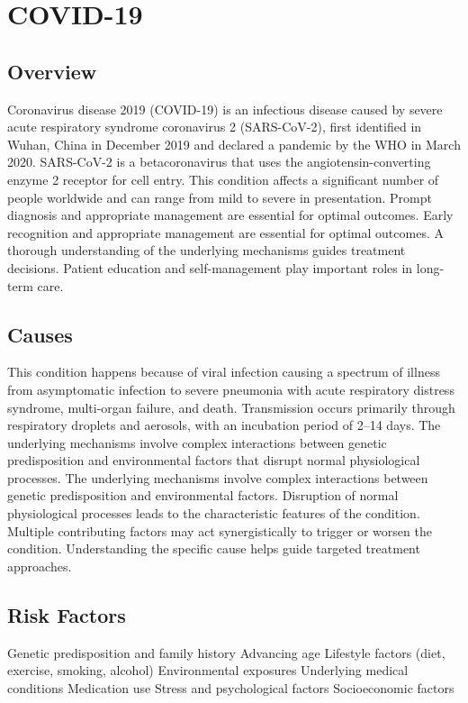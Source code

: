 \chapter{COVID-19}
\label{sec:COVID-19}

\section{Overview}
Coronavirus disease 2019 (COVID-19) is an infectious disease caused by severe acute respiratory syndrome coronavirus 2 (SARS-CoV-2), first identified in Wuhan, China in December 2019 and declared a pandemic by the WHO in March 2020. SARS-CoV-2 is a betacoronavirus that uses the angiotensin-converting enzyme 2 receptor for cell entry. This condition affects a significant number of people worldwide and can range from mild to severe in presentation. Prompt diagnosis and appropriate management are essential for optimal outcomes. Early recognition and appropriate management are essential for optimal outcomes. A thorough understanding of the underlying mechanisms guides treatment decisions. Patient education and self-management play important roles in long-term care.
\section{Causes}
This condition happens because of viral infection causing a spectrum of illness from asymptomatic infection to severe pneumonia with acute respiratory distress syndrome, multi-organ failure, and death. Transmission occurs primarily through respiratory droplets and aerosols, with an incubation period of 2--14 days. The underlying mechanisms involve complex interactions between genetic predisposition and environmental factors that disrupt normal physiological processes. The underlying mechanisms involve complex interactions between genetic predisposition and environmental factors. Disruption of normal physiological processes leads to the characteristic features of the condition. Multiple contributing factors may act synergistically to trigger or worsen the condition. Understanding the specific cause helps guide targeted treatment approaches.
\section{Risk Factors}
Genetic predisposition and family history Advancing age Lifestyle factors (diet, exercise, smoking, alcohol) Environmental exposures Underlying medical conditions Medication use Stress and psychological factors Socioeconomic factors

